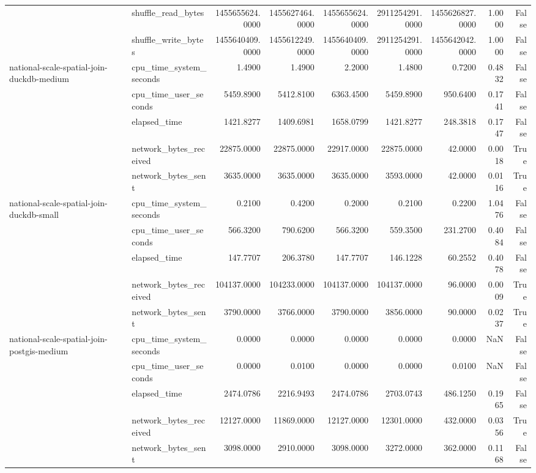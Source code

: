 \begin{tabular}{llrrrrrrr}
 & shuffle\_read\_bytes & 1455655624.0000 & 1455627464.0000 & 1455655624.0000 & 2911254291.0000 & 1455626827.0000 & 1.0000 & False \\
 & shuffle\_write\_bytes & 1455640409.0000 & 1455612249.0000 & 1455640409.0000 & 2911254291.0000 & 1455642042.0000 & 1.0000 & False \\
\cline{1-9}
\multirow[t]{5}{*}{national-scale-spatial-join-duckdb-medium} & cpu\_time\_system\_seconds & 1.4900 & 1.4900 & 2.2000 & 1.4800 & 0.7200 & 0.4832 & False \\
 & cpu\_time\_user\_seconds & 5459.8900 & 5412.8100 & 6363.4500 & 5459.8900 & 950.6400 & 0.1741 & False \\
 & elapsed\_time & 1421.8277 & 1409.6981 & 1658.0799 & 1421.8277 & 248.3818 & 0.1747 & False \\
 & network\_bytes\_received & 22875.0000 & 22875.0000 & 22917.0000 & 22875.0000 & 42.0000 & 0.0018 & True \\
 & network\_bytes\_sent & 3635.0000 & 3635.0000 & 3635.0000 & 3593.0000 & 42.0000 & 0.0116 & True \\
\cline{1-9}
\multirow[t]{5}{*}{national-scale-spatial-join-duckdb-small} & cpu\_time\_system\_seconds & 0.2100 & 0.4200 & 0.2000 & 0.2100 & 0.2200 & 1.0476 & False \\
 & cpu\_time\_user\_seconds & 566.3200 & 790.6200 & 566.3200 & 559.3500 & 231.2700 & 0.4084 & False \\
 & elapsed\_time & 147.7707 & 206.3780 & 147.7707 & 146.1228 & 60.2552 & 0.4078 & False \\
 & network\_bytes\_received & 104137.0000 & 104233.0000 & 104137.0000 & 104137.0000 & 96.0000 & 0.0009 & True \\
 & network\_bytes\_sent & 3790.0000 & 3766.0000 & 3790.0000 & 3856.0000 & 90.0000 & 0.0237 & True \\
\cline{1-9}
\multirow[t]{5}{*}{national-scale-spatial-join-postgis-medium} & cpu\_time\_system\_seconds & 0.0000 & 0.0000 & 0.0000 & 0.0000 & 0.0000 & NaN & False \\
 & cpu\_time\_user\_seconds & 0.0000 & 0.0100 & 0.0000 & 0.0000 & 0.0100 & NaN & False \\
 & elapsed\_time & 2474.0786 & 2216.9493 & 2474.0786 & 2703.0743 & 486.1250 & 0.1965 & False \\
 & network\_bytes\_received & 12127.0000 & 11869.0000 & 12127.0000 & 12301.0000 & 432.0000 & 0.0356 & True \\
 & network\_bytes\_sent & 3098.0000 & 2910.0000 & 3098.0000 & 3272.0000 & 362.0000 & 0.1168 & False \\

\end{tabular}
